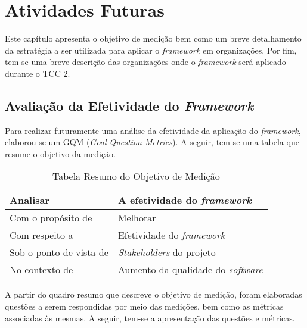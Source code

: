 \chapter{Atividades Futuras}

Este capítulo apresenta o objetivo de medição bem como um breve detalhamento da estratégia a ser utilizada para aplicar o \textit{framework} em organizações. Por fim, tem-se uma breve descrição das organizações onde o \textit{framework} será aplicado durante o TCC 2.

\section{Avaliação da Efetividade do \textit{Framework}}

Para realizar futuramente uma análise da efetividade da aplicação do \textit{framework}, elaborou-se um GQM (\textit{Goal Question Metrics}). A seguir, tem-se uma tabela que resume o objetivo da medição.

\begin{table}[h]
\centering
\begin{tabular}{ | m{8cm} | m{8cm} | } 
\hline
Analisar & A efetividade do \textit{framework} \\ 
\hline
Com o propósito de & Melhorar \\ 
\hline
Com respeito a & Efetividade do \textit{framework} \\ 
\hline
Sob o ponto de vista de & \textit{Stakeholders} do projeto \\ 
\hline
No contexto de & Aumento da qualidade do \textit{software} \\ 
\hline
\end{tabular}
\caption{Tabela Resumo do Objetivo de Medição}\label{table:1}
\end{table}

A partir do quadro resumo que descreve o objetivo de medição, foram elaboradas questões a serem respondidas por meio das medições, bem como as métricas associadas às mesmas. A seguir, tem-se a apresentação das questões e métricas.

